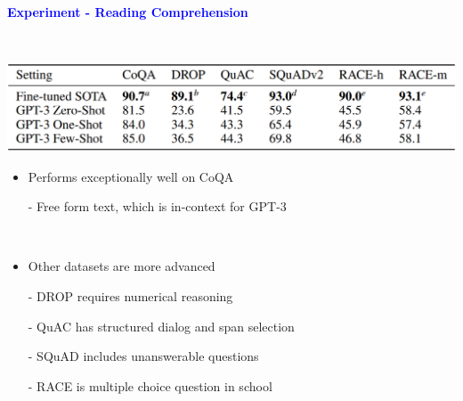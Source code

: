 \documentclass[professionalfont]{beamer}
\begin{document}
\begin{frame}

\begin{center}
    { \textbf{\textcolor{blue}{ {\fontsize{12}{14}\selectfont Experiment - Reading Comprehension} }} }
\end{center}
\\[0.2cm]

\begin{center}
    \includegraphics[width=1.0\textwidth]{table/3-7.png}
\end{center}

{\fontsize{10}{14}\selectfont 
\begin{itemize}
    \item Performs exceptionally well on CoQA

    - Free form text, which is in-context for GPT-3

    \\[0.2cm]

    \item Other datasets are more advanced

    - DROP requires numerical reasoning

    - QuAC has structured dialog and span selection

    - SQuAD includes unanswerable questions

    - RACE is multiple choice question in school

\end{itemize}
}

\end{frame}
\end{document}
